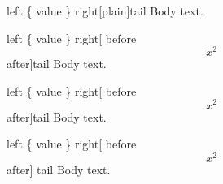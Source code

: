 
\begin{escapedargs}{left \{ value \} right}[plain]{tail}
  Body text.
\end{escapedargs}

\begin{escapedargs}{left \{ value \} right}[
    before \[
      x^2
    \] after]{tail}
  Body text.
\end{escapedargs}

\begin{escapedargs}{left \{ value \} right}[
    before \[
      x^2
    \] after]{tail}
  Body text.
\end{escapedargs}

\begin{escapedargs}{left \{ value \} right}[
    before \[
      x^2
    \] after]%
  {tail}
  Body text.
\end{escapedargs}

